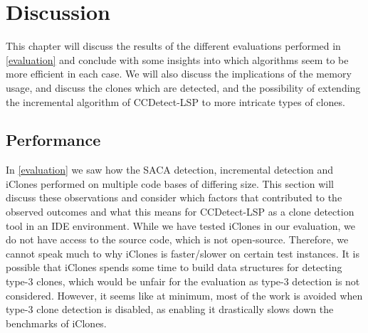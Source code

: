 \chapter{Discussion}

This chapter will discuss the results of the different evaluations performed in
\cref{evaluation} and conclude with some insights into which algorithms seem to be more
efficient in each case. We will also discuss the implications of the memory usage, and
discuss the clones which are detected, and the possibility of extending the incremental
algorithm of CCDetect-LSP to more intricate types of clones.

\section{Performance}

In \cref{evaluation} we saw how the SACA detection, incremental detection and iClones
performed on multiple code bases of differing size. This section will discuss these
observations and consider which factors that contributed to the observed outcomes and what
this means for CCDetect-LSP as a clone detection tool in an IDE environment. While we have
tested iClones in our evaluation, we do not have access to the source code, which is not
open-source. Therefore, we cannot speak much to why iClones is faster/slower on certain
test instances. It is possible that iClones spends some time to build data structures for
detecting type-3 clones, which would be unfair for the evaluation as type-3 detection is
not considered. However, it seems like at minimum, most of the work is avoided when type-3
clone detection is disabled, as enabling it drastically slows down the benchmarks of
iClones.

